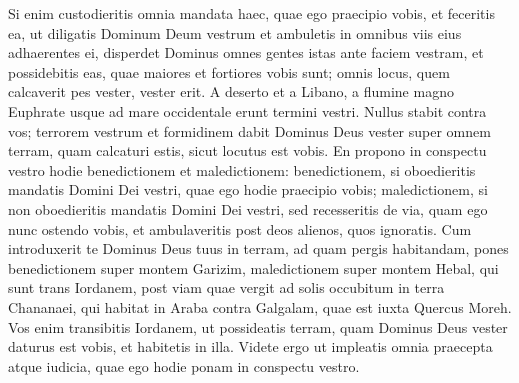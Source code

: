 \begin{biblechapter}
\verse Si enim custodieritis omnia mandata haec, quae ego praecipio vobis, et feceritis ea, ut diligatis Dominum Deum vestrum et ambuletis in omnibus viis eius adhaerentes ei, 
\verse disperdet Dominus omnes gentes istas ante faciem vestram, et possidebitis eas, quae maiores et fortiores vobis sunt; 
\verse omnis locus, quem calcaverit pes vester, vester erit. A deserto et a Libano, a flumine magno Euphrate usque ad mare occidentale erunt termini vestri. 
\verse Nullus stabit contra vos; terrorem vestrum et formidinem dabit Dominus Deus vester super omnem terram, quam calcaturi estis, sicut locutus est vobis. 
\verse En propono in conspectu vestro hodie benedictionem et maledictionem: 
\verse benedictionem, si oboedieritis mandatis Domini Dei vestri, quae ego hodie praecipio vobis; 
\verse maledictionem, si non oboedieritis mandatis Domini Dei vestri, sed recesseritis de via, quam ego nunc ostendo vobis, et ambulaveritis post deos alienos, quos ignoratis. 
\verse Cum introduxerit te Dominus Deus tuus in terram, ad quam pergis habitandam, pones benedictionem super montem Garizim, maledictionem super montem Hebal, 
\verse qui sunt trans Iordanem, post viam quae vergit ad solis occubitum in terra Chananaei, qui habitat in Araba contra Galgalam, quae est iuxta Quercus Moreh. 
\verse Vos enim transibitis Iordanem, ut possideatis terram, quam Dominus Deus vester daturus est vobis, et habitetis in illa. 
\verse Videte ergo ut impleatis omnia praecepta atque iudicia, quae ego hodie ponam in conspectu vestro. 
\end{biblechapter}

